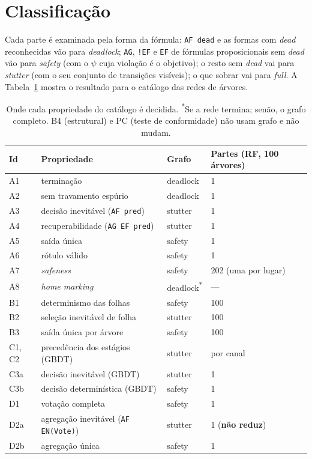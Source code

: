 \documentclass[11pt,a4paper]{report}
\newcommand{\code}[1]{\texttt{\small #1}}
\theoremstyle{definition}
\begin{document}
\section{Classificação}

Cada parte é examinada pela forma da fórmula: \code{AF dead} e as formas com
\emph{dead} reconhecidas vão para \emph{deadlock}; \code{AG}, \code{!EF} e
\code{EF} de fórmulas proposicionais sem \emph{dead} vão para \emph{safety}
(com o $\psi$ cuja violação é o objetivo); o resto sem \emph{dead} vai para
\emph{stutter} (com o seu conjunto de transições visíveis); o que sobrar vai
para \emph{full}. A Tabela~\ref{tab:catalogo} mostra o resultado para o
catálogo das redes de árvores.

\begin{table}[ht]
\centering\small
\begin{tabular}{llll}
\toprule
Id & Propriedade & Grafo & Partes (RF, 100 árvores) \\
\midrule
A1 & terminação & deadlock & 1 \\
A2 & sem travamento espúrio & deadlock & 1 \\
A3 & decisão inevitável (\code{AF pred}) & stutter & 1 \\
A4 & recuperabilidade (\code{AG EF pred}) & stutter & 1 \\
A5 & saída única & safety & 1 \\
A6 & rótulo válido & safety & 1 \\
A7 & \emph{safeness} & safety & 202 (uma por lugar) \\
A8 & \emph{home marking} & deadlock\textsuperscript{*} & --- \\
B1 & determinismo das folhas & safety & 100 \\
B2 & seleção inevitável de folha & stutter & 100 \\
B3 & saída única por árvore & safety & 100 \\
C1, C2 & precedência dos estágios (GBDT) & stutter & por canal \\
C3a & decisão inevitável (GBDT) & stutter & 1 \\
C3b & decisão determinística (GBDT) & safety & 1 \\
D1 & votação completa & safety & 1 \\
D2a & agregação inevitável (\code{AF EN(Vote)}) & stutter & 1 (\textbf{não reduz}) \\
D2b & agregação única & safety & 1 \\
\bottomrule
\end{tabular}
\caption{Onde cada propriedade do catálogo é decidida. \textsuperscript{*}Se a
rede termina; senão, o grafo completo. B4 (estrutural) e PC
(teste de conformidade) não usam grafo e não mudam.}
\label{tab:catalogo}
\end{table}
\end{document}
